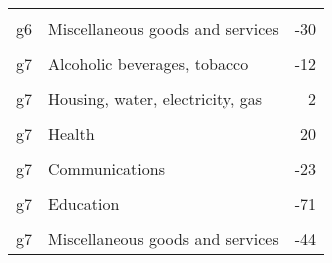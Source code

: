 \documentclass[10pt,a4paper]{report}
\begin{document}
\begin{table}
{\begin{tabular}[t]{llr}
\cellcolor{gray!10}{g6} & \cellcolor{gray!10}{Restaurants and hotels} & \cellcolor{gray!10}{-28}\\
g6 & Miscellaneous goods and services & -30\\
\cellcolor{gray!10}{g7} & \cellcolor{gray!10}{Food and non-alcoholic beverages} & \cellcolor{gray!10}{-50}\\
g7 & Alcoholic beverages, tobacco & -12\\
\cellcolor{gray!10}{g7} & \cellcolor{gray!10}{Clothing and footwear} & \cellcolor{gray!10}{-25}\\
\addlinespace
g7 & Housing, water, electricity, gas & 2\\
\cellcolor{gray!10}{g7} & \cellcolor{gray!10}{Furniture, household goods} & \cellcolor{gray!10}{-5}\\
g7 & Health & 20\\
\cellcolor{gray!10}{g7} & \cellcolor{gray!10}{Transport} & \cellcolor{gray!10}{-116}\\
g7 & Communications & -23\\
\addlinespace
\cellcolor{gray!10}{g7} & \cellcolor{gray!10}{Recreation and culture} & \cellcolor{gray!10}{-33}\\
g7 & Education & -71\\
\cellcolor{gray!10}{g7} & \cellcolor{gray!10}{Restaurants and hotels} & \cellcolor{gray!10}{-44}\\
g7 & Miscellaneous goods and services & -44\\
\bottomrule
\end{tabular}}
\end{table}
\end{document}
